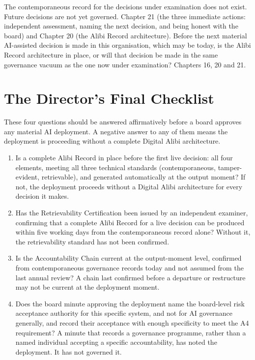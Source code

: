 {The contemporaneous record for the decisions under examination does not exist. Future decisions are not yet governed.}
{Chapter 21 (the three immediate actions: independent assessment, naming the next decision, and being honest with the board) and Chapter 20 (the Alibi Record architecture).}
{Before the next material AI-assisted decision is made in this organisation, which may be today, is the Alibi Record architecture in place, or will that decision be made in the same governance vacuum as the one now under examination?}
{Chapters 16, 20 and 21.}

\section{The Director's Final Checklist}

These four questions should be answered affirmatively before a board approves any material AI deployment. A negative answer to any of them means the deployment is proceeding without a complete Digital Alibi architecture.

\begin{enumerate}
\item Is a complete Alibi Record in place before the first live decision: all four elements, meeting all three technical standards (contemporaneous, tamper-evident, retrievable), and generated automatically at the output moment? If not, the deployment proceeds without a Digital Alibi architecture for every decision it makes.
\item Has the Retrievability Certification been issued by an independent examiner, confirming that a complete Alibi Record for a live decision can be produced within five working days from the contemporaneous record alone? Without it, the retrievability standard has not been confirmed.
\item Is the Accountability Chain current at the output-moment level, confirmed from contemporaneous governance records today and not assumed from the last annual review? A chain last confirmed before a departure or restructure may not be current at the deployment moment.
\item Does the board minute approving the deployment name the board-level risk acceptance authority for this specific system, and not for AI governance generally, and record their acceptance with enough specificity to meet the A4 requirement? A minute that records a governance programme, rather than a named individual accepting a specific accountability, has noted the deployment. It has not governed it.
\end{enumerate}


